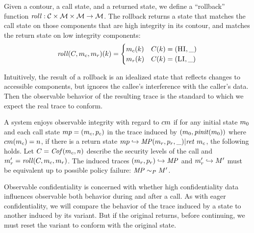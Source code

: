 \documentclass[acmsmall,review,anonymous]{acmart}\settopmatter{printfolios=true,printccs=false,printacmref=false}
\begin{document}
      Given a contour, a call state, and a returned state, we define a
      ``rollback'' function \(\mathit{roll} : {\mathcal C} \times {\mathcal M} \times
      {\mathcal M} \rightarrow {\mathcal M}\). The rollback returns a state that matches
      the call state on those components that are high integrity in its
      contour, and matches the return state on low integrity components:
      \[\mathit{roll}(C,m_c,m_r)(k) =
      \begin{cases}
        m_c(k) & C(k) = (\textsc{HI},\_) \\
        m_r(k) & C(k) = (\textsc{LI},\_) \\
      \end{cases}\]

      Intuitively, the result of a rollback is an idealized state that
      reflects changes to accessible components, but ignores the callee's
      interference with the caller's data. Then the observable behavior of the
      resulting trace is the standard to which we expect the real trace to
      conform.

      A system enjoys observable integrity with regard to \(cm\) if
      for any initial state \(m_0\) and each call state \(mp =
      (m_c,p_c)\) in the trace induced by
      \((m_0,\mathit{pinit}(m_0))\) where \(cm(m_c)
      = n\), if there is a return state \(mp \hookrightarrow \mathit{MP}
      (m_r,p_r,\_) | \mathit{ret}\ m_c\), the following holds.
      Let \(C = \mathit{Cof}(m_c,n)\) describe the security levels
      of the call and \(m_r' = \mathit{roll}(C,m_c,m_r)\).
      The induced traces \((m_r,p_r) \hookrightarrow \mathit{MP}\)
      and \(m_r' \hookrightarrow M'\) must be equivalent up to
      possible policy failure: \(\mathit{MP} \sim_P M'\).
      

      Observable confidentiality is concerned with whether high confidentiality
      data influences observable both behavior during and after a call. As with
      eager confidentiality, we will compare the behavior of the trace induced
      by a state to another induced by its variant. But if the original returns,
      before continuing, we must reset the variant to conform with the original
      state.
\end{document}

